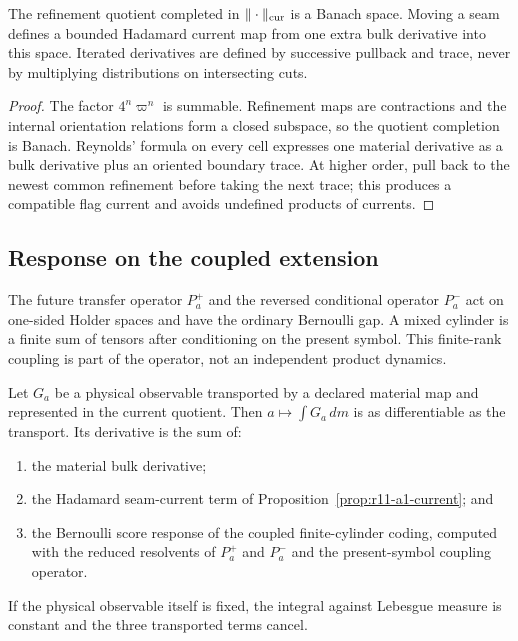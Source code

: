 \begin{proposition}
\label{prop:r11-a1-current}
The refinement quotient completed in $\|\cdot\|_{\rm cur}$ is a Banach
space.  Moving a seam defines a bounded Hadamard current map from one extra
bulk derivative into this space.  Iterated derivatives are defined by
successive pullback and trace, never by multiplying distributions on
intersecting cuts.
\end{proposition}

\begin{proof}
The factor $4^n\varpi^n$ is summable.  Refinement maps are contractions and
the internal orientation relations form a closed subspace, so the quotient
completion is Banach.  Reynolds' formula on every cell expresses one material
derivative as a bulk derivative plus an oriented boundary trace.  At higher
order, pull back to the newest common refinement before taking the next trace;
this produces a compatible flag current and avoids undefined products of
currents.
\end{proof}

\subsection{Response on the coupled extension}
The future transfer operator $P_a^+$ and the reversed conditional operator
$P_a^-$ act on one-sided Holder spaces and have the ordinary Bernoulli gap.
A mixed cylinder is a finite sum of tensors after conditioning on the present
symbol.  This finite-rank coupling is part of the operator, not an independent
product dynamics.

\begin{theorem}
\label{thm:r11-a1-response}
Let $G_a$ be a physical observable transported by a declared material map
and represented in the current quotient.  Then $a\mapsto\int G_a\,dm$ is
as differentiable as the transport.  Its derivative is the sum of:
\begin{enumerate}[label=(\roman*)]
\item the material bulk derivative;
\item the Hadamard seam-current term of
      Proposition~\ref{prop:r11-a1-current}; and
\item the Bernoulli score response of the coupled finite-cylinder coding,
      computed with the reduced resolvents of $P_a^+$ and $P_a^-$ and
      the present-symbol coupling operator.
\end{enumerate}
If the physical observable itself is fixed, the integral against Lebesgue
measure is constant and the three transported terms cancel.
\end{theorem}

